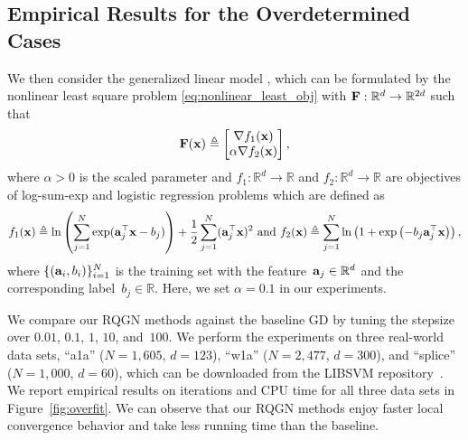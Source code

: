 \documentclass[11pt]{article}
\theoremstyle{plain}
\theoremstyle{definition}
\theoremstyle{remark}
\theoremstyle{plain}
\def\va{{\bf{a}}}
\def\BR{{\mathbb{R}}}
\def\mF {{\bf F}}
\def\va {{{\bf a}}}
\def\BR{{\mathbb{R}}}
\def\F{{\bf F}}
\def\x{{\bf x}}
\begin{document}
\subsection{Empirical Results for the Overdetermined Cases}
We then consider the generalized linear model \citep{shao2025convergence}, which can be formulated by  the nonlinear least square problem \eqref{eq:nonlinear_least_obj} with $\mF:\BR^d\to\BR^{2d}$ such that
\begin{align}
\label{eq:overfit}
    \F(\x)  \triangleq \begin{bmatrix}
        \nabla f_1(\x)\\
        \alpha\nabla f_2(\x)
    \end{bmatrix},
\end{align}
where $\alpha>0$ is the scaled parameter and $f_1:\BR^d\to\BR$ and $f_2:\BR^d\to\BR$ are objectives of log-sum-exp and logistic regression problems  \citep{rodomanov2021greedy} which are defined as 
\begin{align*}
f_1(\x)\triangleq \ln\left(\sum_{j=1}^N\exp(\va_j^{\top}\x-b_j)\right)+\frac{1}{2}\sum_{j=1}^N(\va_j^\top\x)^2
~\text{and}~f_2(\x)\triangleq \sum_{j=1}^N
 \ln\left(1+\exp\left(-b_j\va_j^{\top}\x\right)\right),
\end{align*}
where $\{(\va_i, b_i)\}_{i=1}^N$ is the training set with the feature~$\va_j\in\BR^d$ and the corresponding label~$b_j\in\BR$.
Here, we set $\alpha = 0.1$ in our experiments.

We compare our RQGN methods against the baseline GD by tuning the stepsize over $0.01$, $0.1$, $1$, $10$, and~$100$.
We perform the experiments on three real-world data sets, ``a1a'' ($N=1,605$, $d=123$), ``w1a'' ($N=2,477$, $d=300$), and ``splice'' ($N=1,000$, $d=60$), which can be downloaded from the LIBSVM repository~\citep{CC01a}.
We report empirical results on iterations and CPU time for all three data sets in Figure~\ref{fig:overfit}.
We can observe that our RQGN methods enjoy faster local convergence behavior and take less running time than the baseline.
\end{document}
